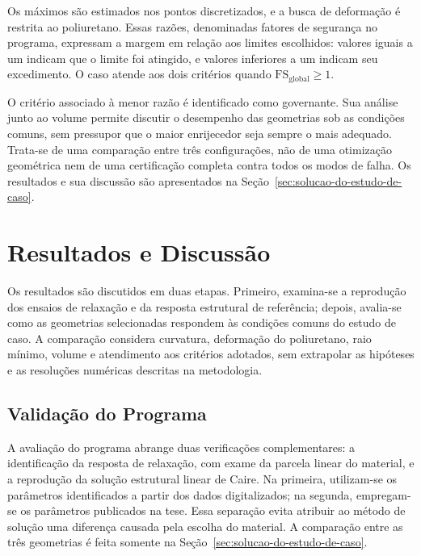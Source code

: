 \documentclass[arial,centeredequations,english,brazilian,oneside,section=TITLE]{ifes8}
\begin{document}
Os máximos são estimados nos pontos discretizados, e a busca de deformação
é restrita ao poliuretano. Essas razões, denominadas fatores de segurança
no programa, expressam a margem em relação aos limites escolhidos: valores
iguais a um indicam que o limite foi atingido, e valores inferiores a um
indicam seu excedimento. O caso atende aos dois critérios quando
$\mathrm{FS}_{\mathrm{global}}\geq1$.

O critério associado à menor razão é identificado como governante. Sua
análise junto ao volume permite discutir o desempenho das geometrias sob
as condições comuns, sem pressupor que o maior enrijecedor seja sempre
o mais adequado. Trata-se de uma comparação entre três configurações,
não de uma otimização geométrica nem de uma certificação completa contra
todos os modos de falha. Os resultados e sua discussão são apresentados
na Seção~\ref{sec:solucao-do-estudo-de-caso}.

\chapter{Resultados e Discussão}
\label{sec:resultados-e-discussao}

Os resultados são discutidos em duas etapas. Primeiro, examina-se a
reprodução dos ensaios de relaxação e da resposta estrutural de referência;
depois, avalia-se como as geometrias selecionadas respondem às condições
comuns do estudo de caso. A comparação considera curvatura, deformação do
poliuretano, raio mínimo, volume e atendimento aos critérios adotados, sem
extrapolar as hipóteses e as resoluções numéricas descritas na metodologia.

\section{Validação do Programa}
\label{sec:validacao-programa}

A avaliação do programa abrange duas verificações complementares: a
identificação da resposta de relaxação, com exame da parcela linear do
material, e a reprodução da solução estrutural linear de Caire. Na
primeira, utilizam-se os parâmetros identificados a partir dos dados
digitalizados; na segunda, empregam-se os parâmetros publicados na tese.
Essa separação evita atribuir ao método de solução uma diferença causada
pela escolha do material. A comparação entre as três geometrias é feita
somente na Seção~\ref{sec:solucao-do-estudo-de-caso}.
\end{document}
